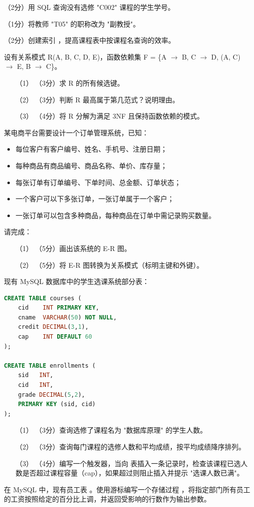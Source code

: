 \documentclass[a4paper,11pt]{article}
\begin{document}
\q （2分）用 SQL 查询没有选修 "C002" 课程的学生学号。
\anslines{1cm}

\q （1分）将教师 "T05" 的职称改为 "副教授"。
\anslines{0.8cm}

\q （2分）创建索引 ，提高课程表中按课程名查询的效率。
\anslines{0.8cm}


\q 设有关系模式 R(A, B, C, D, E)，函数依赖集 F = \{A $\rightarrow$ B, C $\rightarrow$ D, (A, C) $\rightarrow$ E, B $\rightarrow$ C\}。
\begin{enumerate}[leftmargin=2em, itemsep=3pt]
  \item[（1）] （3分）求 R 的所有候选键。
  \item[（2）] （3分）判断 R 最高属于第几范式？说明理由。
  \item[（3）] （4分）将 R 分解为满足 3NF 且保持函数依赖的模式。
\end{enumerate}
\anslines{4cm}


\q 某电商平台需要设计一个订单管理系统，已知：
\begin{itemize}
  \item 每位客户有客户编号、姓名、手机号、注册日期；
  \item 每种商品有商品编号、商品名称、单价、库存量；
  \item 每张订单有订单编号、下单时间、总金额、订单状态；
  \item 一个客户可以下多张订单，一张订单属于一个客户；
  \item 一张订单可以包含多种商品，每种商品在订单中需记录购买数量。
\end{itemize}
请完成：
\begin{enumerate}[leftmargin=2em, itemsep=3pt]
  \item[（1）] （5分）画出该系统的 E-R 图。
  \item[（2）] （5分）将 E-R 图转换为关系模式（标明主键和外键）。
\end{enumerate}
\anslines{5cm}


\q 现有 MySQL 数据库中的学生选课系统部分表：
\begin{lstlisting}[language=SQL]
CREATE TABLE courses (
    cid    INT PRIMARY KEY,
    cname  VARCHAR(50) NOT NULL,
    credit DECIMAL(3,1),
    cap    INT DEFAULT 60
);

CREATE TABLE enrollments (
    sid   INT,
    cid   INT,
    grade DECIMAL(5,2),
    PRIMARY KEY (sid, cid)
);
\end{lstlisting}
\begin{enumerate}[leftmargin=2em, itemsep=3pt]
  \item[（1）] （3分）查询选修了课程名为 "数据库原理" 的学生人数。
  \item[（2）] （3分）查询每门课程的选修人数和平均成绩，按平均成绩降序排列。
  \item[（3）] （4分）编写一个触发器，当向  表插入一条记录时，检查该课程已选人数是否超过课程容量（cap），如果超过则阻止插入并提示 "选课人数已满"。
\end{enumerate}
\anslines{4cm}

\q 在 MySQL 中，现有员工表 。使用游标编写一个存储过程 ，将指定部门所有员工的工资按照给定的百分比上调，并返回受影响的行数作为输出参数。
\anslines{4cm}
\end{document}
